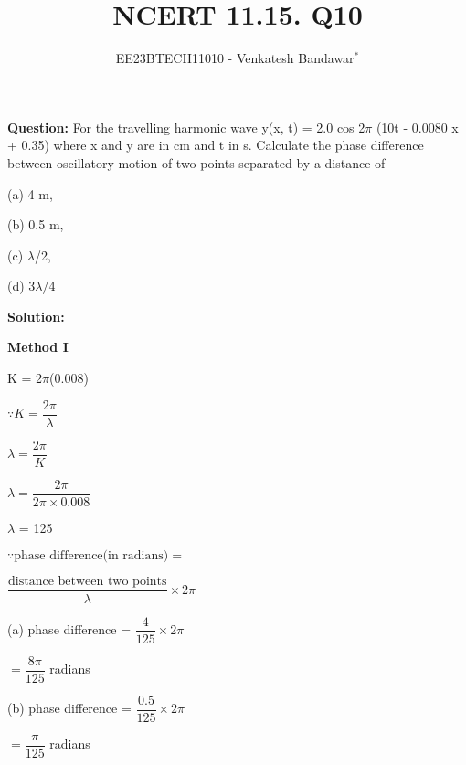 \documentclass[journal,12pt,twocolumn]{IEEEtran}
\theoremstyle{remark}
\begin{document}

\vspace{3cm}

\title{NCERT 11.15. Q10}
\author{EE23BTECH11010 - Venkatesh Bandawar$^{*}$%
}
\maketitle
\newpage
\bigskip

\renewcommand{\thefigure}{\theenumi}
\renewcommand{\thetable}{\theenumi}




\textbf{Question:} For the travelling harmonic wave
y(x, t) = 2.0 cos 2$\pi$ (10t - 0.0080 x + 0.35) where x and y are in cm and t in s. Calculate the phase difference between oscillatory
motion of two points separated by a distance of 

(a) 4 m,

(b) 0.5 m,

(c) $\lambda$/2,

(d) 3$\lambda$/4

\textbf{Solution:} 

\textbf{Method I} 

K = 2$\pi$(0.008)

$\because K = \dfrac{2\pi}{\lambda}$

$\lambda = \dfrac{2\pi}{K}$

\vspace{0.2cm}

$\lambda = \dfrac{2\pi}{2 \pi \times 0.008}$

\vspace{0.2cm}

$\lambda$ = 125

\vspace{0.2cm}

$\because \text{phase difference(in radians)} =$

\vspace{0.2cm}

$\dfrac{\text{distance between two points}}{\lambda} \times 2\pi$

(a) phase difference = $\dfrac{4}{125} \times 2\pi$

\begin{center}
$ = \dfrac{8\pi}{125}$ radians
\end{center}

(b) phase difference = $\dfrac{0.5}{125} \times 2\pi$

\begin{center}
$ = \dfrac{\pi}{125}$ radians
\end{center}
\end{document}
